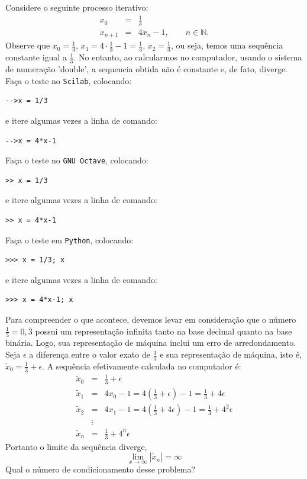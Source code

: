 \begin{ex} Considere o seguinte processo iterativo:
  \begin{eqnarray*}
    x_0 &=& \frac{1}{3}\\
    x_{n+1} &=& 4x_n-1,\qquad n\in\mathbb{N}.
  \end{eqnarray*}
Observe que $x_0=\frac{1}{3}$, $x_1=4\cdot \frac{1}{3}-1=\frac{1}{3}$, $x_2=\frac{1}{3}$, ou seja, temos uma sequência constante igual a $\frac{1}{3}$. No entanto, ao calcularmos no computador, usando o sistema de numeração 'double', a sequencia obtida não é constante e, de fato, diverge.
\ifisscilab
Faça o teste no \verb+Scilab+, colocando:
\begin{verbatim}
-->x = 1/3
\end{verbatim}
e itere algumas vezes a linha de comando:
\begin{verbatim}
-->x = 4*x-1
\end{verbatim}
\fi
\ifisoctave
Faça o teste no \verb+GNU Octave+, colocando:
\begin{verbatim}
>> x = 1/3
\end{verbatim}
e itere algumas vezes a linha de comando:
\begin{verbatim}
>> x = 4*x-1
\end{verbatim}
\fi
\ifispython
Faça o teste em \verb+Python+, colocando:
\begin{verbatim}
>>> x = 1/3; x
\end{verbatim}
e itere algumas vezes a linha de comando:
\begin{verbatim}
>>> x = 4*x-1; x
\end{verbatim}
\fi

Para compreender o que acontece, devemos levar em consideração que o número $\frac{1}{3}=0,\overline{3}$ possui um representação infinita tanto na base decimal quanto na base binária. Logo, sua representação de máquina inclui um erro de arredondamento. Seja $\epsilon$ a diferença entre o valor exato de $\frac{1}{3}$ e sua representação de máquina, isto é, $\tilde{x}_0=\frac{1}{3}+\epsilon$. A sequência efetivamente calculada no computador é:
\begin{eqnarray*}
\tilde{x}_0&=&\frac{1}{3}+\epsilon\\
\tilde{x}_1&=&4x_0-1=4\left(\frac{1}{3}+\epsilon\right)-1=\frac{1}{3}+4\epsilon\\
\tilde{x}_2&=&4x_1-1=4\left(\frac{1}{3}+4\epsilon\right)-1=\frac{1}{3}+4^2\epsilon\\
&\vdots&\\
\tilde{x}_n&=&\frac{1}{3}+4^n\epsilon
\end{eqnarray*}
Portanto o limite da sequência diverge,
\begin{equation*}
\lim_{x\to\infty}|\tilde{x}_n|=\infty  
\end{equation*}
Qual o número de condicionamento desse problema?
\end{ex}


